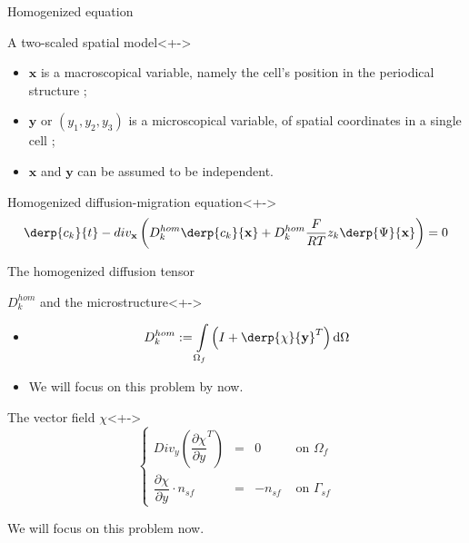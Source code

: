 \begin{frame}{Homogenized equation}
%
\begin{block}{A two-scaled spatial model}<+->
\begin{itemize}
\item<+-> $\mathbf{x}$ is a macroscopical variable, namely the cell's position in the periodical structure ;
\item<+-> $\mathbf{y}$ or $(y_1,y_2,y_3)$ is a microscopical variable, of spatial coordinates in a single cell ;
\item<+-> $\mathbf{x}$ and $\mathbf{y}$ can be assumed to be independent.
\end{itemize}
\end{block}
%
\begin{block}{Homogenized diffusion-migration equation}<+->
\[\derp{c_k}{t}-div_{\mathbf{x}}\left(D_k^{hom}\derp{c_k}{\mathbf{x}}+D_k^{hom}\frac{F}{RT}z_k \derp{\Psi}{\mathbf{x}}\right)=0\]
\end{block}
%
\end{frame}

\begin{frame}{The homogenized diffusion tensor}
%
\begin{block}{$D_k^{hom}$ and the microstructure}<+->%
\begin{itemize}
\item<+-> \[D_k^{hom}:=\int\limits_{\Omega_f}\left(I+\derp{\chi}{\mathbf{y}}^T\right)\text{d}\Omega\]
\item<+-> We will focus on this problem by now.
\end{itemize}
\end{block}
%
\begin{block}{The vector field $\chi$}<+->
\[%
\left\{%
\begin{array}{lccr}
Div_y \left( \dfrac{\partial{\chi}}{\partial{y}}^T\right) &=& 0&\text{ on }\Omega_f \\
\dfrac{\partial{\chi}}{\partial{y}} \cdot n_{sf}&=&-n_{sf}&\text{ on }\Gamma_{sf}
\end{array}
\right.
\]

\pause
We will focus on this problem now.
\end{block}
%
\end{frame}